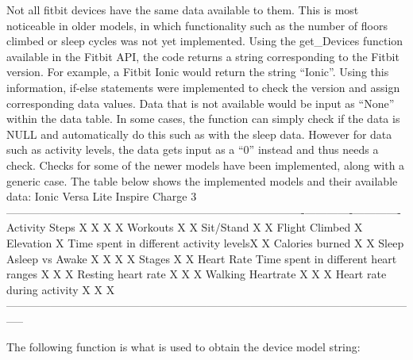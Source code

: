 \documentclass[]{book}
\begin{document}
Not all fitbit devices have the same data available to them. This is most noticeable in older models, in which functionality such as the number of floors climbed or sleep cycles was not yet implemented. Using the get\_Devices function available in the Fitbit API, the code returns a string corresponding to the Fitbit version. For example, a Fitbit Ionic would return the string ``Ionic''. Using this information, if-else statements were implemented to check the version and assign corresponding data values. Data that is not available would be input as ``None'' within the data table. In some cases, the function can simply check if the data is NULL and automatically do this such as with the sleep data. However for data such as activity levels, the data gets input as a ``0'' instead and thus needs a check. Checks for some of the newer models have been implemented, along with a generic case. The table below shows the implemented models and their available data:
\textbar{} \textbar{}Ionic \textbar{} Versa Lite \textbar{}Inspire \textbar{}Charge 3 \textbar{}
---------------\textbar{}---------------------------------------\textbar{}--------------\textbar{}-------------\textbar{}-------------\textbar{}-------------\textbar{}
Activity \textbar{}Steps \textbar{}X \textbar{}X \textbar{}X \textbar{}X \textbar{}
\textbar{}Workouts \textbar{}X \textbar{}X \textbar{} \textbar{} \textbar{}
\textbar{}Sit/Stand \textbar{}X \textbar{}X \textbar{} \textbar{} \textbar{}
\textbar{}Flight Climbed \textbar{}X \textbar{} \textbar{} \textbar{} \textbar{}
\textbar{}Elevation \textbar{}X \textbar{} \textbar{} \textbar{} \textbar{}
\textbar{}Time spent in different activity levels\textbar{}X \textbar{}X \textbar{} \textbar{} \textbar{}
\textbar{}Calories burned \textbar{}X \textbar{}X \textbar{} \textbar{} \textbar{}
Sleep \textbar{}Asleep vs Awake \textbar{}X \textbar{}X \textbar{}X \textbar{}X \textbar{}
\textbar{}Stages \textbar{}X \textbar{}X \textbar{} \textbar{} \textbar{}
Heart Rate \textbar{}Time spent in different heart ranges \textbar{}X \textbar{}X \textbar{} \textbar{}X \textbar{}
\textbar{}Resting heart rate \textbar{}X \textbar{}X \textbar{} \textbar{}X \textbar{}
\textbar{}Walking Heartrate \textbar{}X \textbar{}X \textbar{} \textbar{}X \textbar{}
\textbar{}Heart rate during activity \textbar{}X \textbar{}X \textbar{} \textbar{}X \textbar{}
-----------------------------------------------------------------------------------------------------------------

The following function is what is used to obtain the device model string:
\end{document}
